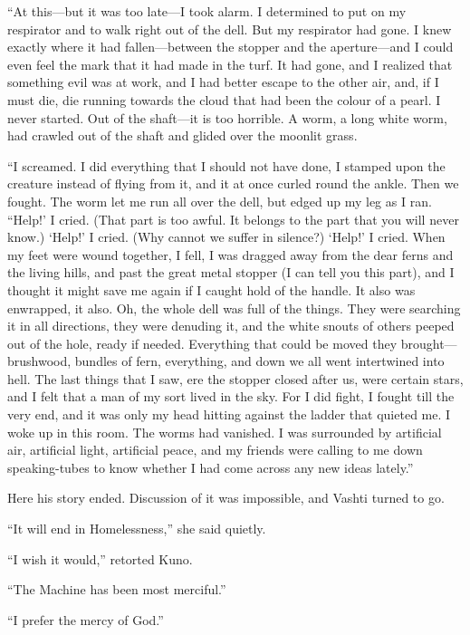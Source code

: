 ``At this---but it was too late---I took alarm. I determined to put on my respirator and to walk right out of the dell. But my respirator had gone. I knew exactly where it had fallen---between the stopper and the aperture---and I could even feel the mark that it had made in the turf. It had gone, and I realized that something evil was at work, and I had better escape to the other air, and, if I must die, die running towards the cloud that had been the colour of a pearl. I never started. Out of the shaft---it is too horrible. A worm, a long white worm, had crawled out of the shaft and glided over the moonlit grass. %

``I screamed. I did everything that I should not have done, I stamped upon the creature instead of flying from it, and it at once curled round the ankle. Then we fought. The worm let me run all over the dell, but edged up my leg as I ran. ``Help!' I cried. (That part is too awful. It belongs to the part that you will never know.) `Help!' I cried. (Why cannot we suffer in silence?) `Help!' I cried. When my feet were wound together, I fell, I was dragged away from the dear ferns and the living hills, and past the great metal stopper (I can tell you this part), and I thought it might save me again if I caught hold of the handle. It also was enwrapped, it also. Oh, the whole dell was full of the things. They were searching it in all directions, they were denuding it, and the white snouts of others peeped out of the hole, ready if needed. Everything that could be moved they brought---brushwood, bundles of fern, everything, and down we all went intertwined into hell. The last things that I saw, ere the stopper closed after us, were certain stars, and I felt that a man of my sort lived in the sky. For I did fight, I fought till the very end, and it was only my head hitting against the ladder that quieted me. I woke up in this room. The worms had vanished. I was surrounded by artificial air, artificial light, artificial peace, and my friends were calling to me down speaking-tubes to know whether I had come across any new ideas lately.''

Here his story ended. Discussion of it was impossible, and Vashti turned to go.

``It will end in Homelessness,'' she said quietly.

``I wish it would,'' retorted Kuno.

``The Machine has been most merciful.''

``I prefer the mercy of God.''

